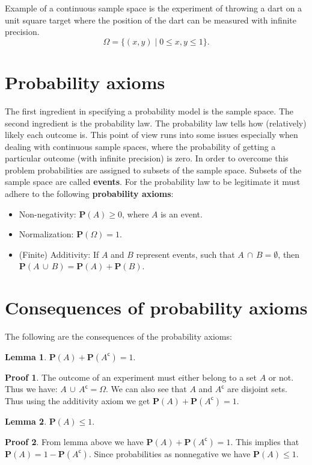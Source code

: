 \documentclass[11pt]{amsart}
\theoremstyle{definition} \newtheorem{thm}{Theorem} \theoremstyle{plain}
\theoremstyle{definition} \newtheorem*{nnthm}{Theorem} \theoremstyle{plain}
\theoremstyle{definition} \newtheorem{lem}{Lemma} \theoremstyle{plain}
\theoremstyle{definition} \newtheorem*{nnlem}{Lemma} \theoremstyle{plain}
\theoremstyle{definition} \newtheorem{prf}{Proof} \theoremstyle{plain}
\theoremstyle{definition} \newtheorem*{nnprf}{Proof} \theoremstyle{plain}
\theoremstyle{definition} \newtheorem{eg}{Example} \theoremstyle{plain}
\theoremstyle{definition} \newtheorem*{sol}{Solution} \theoremstyle{plain}
\newcommand{\setcomp}[1]{{#1}^{\mathsf{c}}}
\newcommand{\prob}[1]{\mathbf{P}(#1)}
\newcommand{\twocup}[2]{{#1} \,\cup\, {#2}}
\newcommand{\twocap}[2]{{#1} \,\cap\, {#2}}
\begin{document}
Example of a continuous sample space is the experiment of throwing a dart on a 
unit square target where the position of the dart can be measured with infinite precision. 
\begin{equation*}
\Omega = \{ (x, y) \mid 0 \leq x, y \leq 1\}.
\end{equation*}

\section{Probability axioms}
The first ingredient in specifying a probability model is the sample space. The 
second ingredient is the probability law. The probability law tells how 
(relatively) likely each outcome is. This point of view runs into some issues 
especially when dealing with continuous sample spaces, where the probability 
of getting a particular outcome (with infinite precision) is zero. In order to 
overcome this problem probabilities are assigned to subsets of the sample space. 
Subsets of the sample space are called \textbf{events}. For the probability law 
to be legitimate it must adhere to the following \textbf{probability axioms}:
\begin{itemize}
\item Non-negativity: $\prob{A} \geq 0$, where $A$ is an event.
\item Normalization: $\prob{\Omega} = 1$.
\item (Finite) Additivity: If $A$ and $B$ represent events, such that 
$\twocap{A}{B} = \emptyset $, then 
$\prob{\twocup{A}{B}} = \prob{A} + \prob{B}$.
\end{itemize}
  

\section{Consequences of probability axioms}
The following are the consequences of the probability axioms:

\begin{lem}
$\prob{A} + \prob{\setcomp{A}} = 1$.
\end{lem}
\begin{nnprf}
The outcome of an experiment must either belong to a set $A$ or 
not. Thus we have: $\twocup{A}{\setcomp{A}} = \Omega$. We can also see that 
$A$ and $\setcomp{A}$ are disjoint sets. Thus using the additivity axiom we 
get $\prob{A} + \prob{\setcomp{A}} = 1$.
\end{nnprf}

\begin{lem}
$\prob{A} \leq  1$.
\end{lem}
\begin{nnprf}
From lemma above we have $\prob{A} + \prob{\setcomp{A}} = 1$. This implies that 
$\prob{A} = 1 - \prob{\setcomp{A}}$. Since probabilities as nonnegative we have 
$\prob{A} \leq 1$. 
\end{nnprf}
\end{document}
